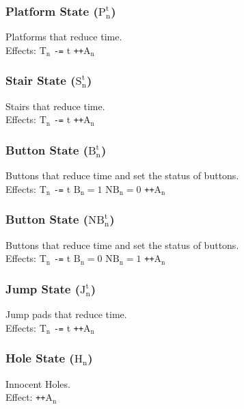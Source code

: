 \documentclass[10pt,twocolumn]{article}
\begin{document}
\subsubsection*{Platform State ($\text{P}_{\text{n}}^{\text{t}}$)}
Platforms that reduce time. \\
Effects: $\text{T}_{\text{n}}$ \texttt{-=} t \quad \texttt{++}$\text{A}_{\text{n}}$

\subsubsection*{Stair State ($\text{S}_{\text{n}}^{\text{t}}$)}
Stairs that reduce time. \\
Effects: $\text{T}_{\text{n}}$ \texttt{-=} t \quad \texttt{++}$\text{A}_{\text{n}}$

\subsubsection*{Button State ($\text{B}_{\text{n}}^{\text{t}}$)}
Buttons that reduce time and set the status of buttons. \\
Effects: $\text{T}_{\text{n}}$ \texttt{-=} t \quad $\text{B}_{\text{n}} = 1$ \quad $\text{NB}_{\text{n}} = 0$ \quad \texttt{++}$\text{A}_{\text{n}}$

\subsubsection*{Button State ($\text{NB}_{\text{n}}^{\text{t}}$)}
Buttons that reduce time and set the status of buttons. \\
Effects: $\text{T}_{\text{n}}$ \texttt{-=} t \quad $\text{B}_{\text{n}} = 0$ \quad $\text{NB}_{\text{n}} = 1$ \quad \texttt{++}$\text{A}_{\text{n}}$

\subsubsection*{Jump State ($\text{J}_{\text{n}}^{\text{t}}$)}
Jump pads that reduce time. \\
Effects: $\text{T}_{\text{n}}$ \texttt{-=} t \quad \texttt{++}$\text{A}_{\text{n}}$

\subsubsection*{Hole State ($\text{H}_{\text{n}}$)}
Innocent Holes. \\
Effect: \texttt{++}$\text{A}_{\text{n}}$
\end{document}
